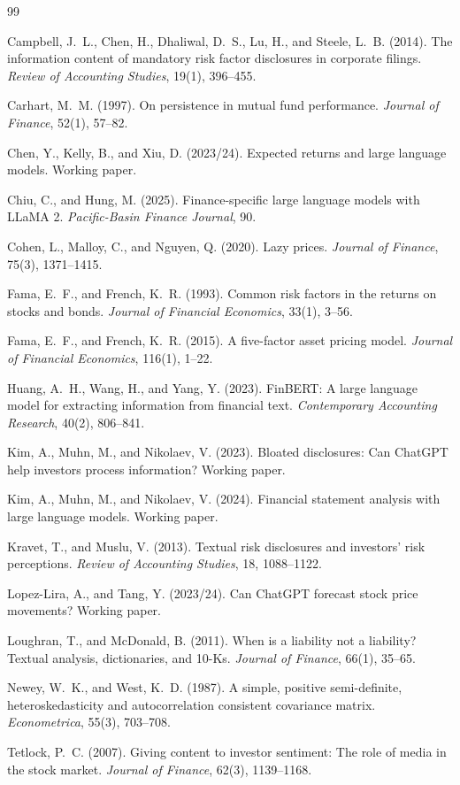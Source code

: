 \documentclass[11pt]{article}
\begin{document}
\begin{thebibliography}{99}
\setlength{\itemsep}{0.25em}

 Campbell, J.~L., Chen, H., Dhaliwal, D.~S., Lu, H., and Steele, L.~B. (2014).
The information content of mandatory risk factor disclosures in corporate filings.
\textit{Review of Accounting Studies}, 19(1), 396--455.

 Carhart, M.~M. (1997). On persistence in mutual fund performance.
\textit{Journal of Finance}, 52(1), 57--82.

 Chen, Y., Kelly, B., and Xiu, D. (2023/24).
Expected returns and large language models. Working paper.

 Chiu, C., and Hung, M. (2025).
Finance-specific large language models with LLaMA 2.
\textit{Pacific-Basin Finance Journal}, 90.

 Cohen, L., Malloy, C., and Nguyen, Q. (2020). Lazy prices.
\textit{Journal of Finance}, 75(3), 1371--1415.

 Fama, E.~F., and French, K.~R. (1993). Common risk factors in the returns
on stocks and bonds. \textit{Journal of Financial Economics}, 33(1), 3--56.

 Fama, E.~F., and French, K.~R. (2015). A five-factor asset pricing model.
\textit{Journal of Financial Economics}, 116(1), 1--22.

 Huang, A.~H., Wang, H., and Yang, Y. (2023). FinBERT: A large language
model for extracting information from financial text.
\textit{Contemporary Accounting Research}, 40(2), 806--841.

 Kim, A., Muhn, M., and Nikolaev, V. (2023).
Bloated disclosures: Can ChatGPT help investors process information? Working paper.

 Kim, A., Muhn, M., and Nikolaev, V. (2024).
Financial statement analysis with large language models. Working paper.

 Kravet, T., and Muslu, V. (2013). Textual risk disclosures and
investors' risk perceptions. \textit{Review of Accounting Studies}, 18, 1088--1122.

 Lopez-Lira, A., and Tang, Y. (2023/24).
Can ChatGPT forecast stock price movements? Working paper.

 Loughran, T., and McDonald, B. (2011). When is a liability not a
liability? Textual analysis, dictionaries, and 10-Ks.
\textit{Journal of Finance}, 66(1), 35--65.

 Newey, W.~K., and West, K.~D. (1987). A simple, positive semi-definite,
heteroskedasticity and autocorrelation consistent covariance matrix.
\textit{Econometrica}, 55(3), 703--708.

 Tetlock, P.~C. (2007). Giving content to investor sentiment: The role
of media in the stock market. \textit{Journal of Finance}, 62(3), 1139--1168.

\end{thebibliography}
\end{document}
